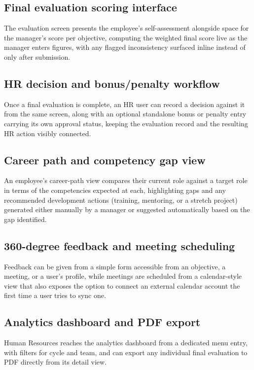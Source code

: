 \documentclass[12pt,a4paper]{report}
\begin{document}
\subsection{Final evaluation scoring interface}

The evaluation screen presents the employee's self-assessment alongside space for the manager's score per objective, computing the weighted final score live as the manager enters figures, with any flagged inconsistency surfaced inline instead of only after submission.

\subsection{HR decision and bonus/penalty workflow}

Once a final evaluation is complete, an HR user can record a decision against it from the same screen, along with an optional standalone bonus or penalty entry carrying its own approval status, keeping the evaluation record and the resulting HR action visibly connected.

\subsection{Career path and competency gap view}

An employee's career-path view compares their current role against a target role in terms of the competencies expected at each, highlighting gaps and any recommended development actions (training, mentoring, or a stretch project) generated either manually by a manager or suggested automatically based on the gap identified.

\subsection{360-degree feedback and meeting scheduling}

Feedback can be given from a simple form accessible from an objective, a meeting, or a user's profile, while meetings are scheduled from a calendar-style view that also exposes the option to connect an external calendar account the first time a user tries to sync one.

\subsection{Analytics dashboard and PDF export}

Human Resources reaches the analytics dashboard from a dedicated menu entry, with filters for cycle and team, and can export any individual final evaluation to PDF directly from its detail view.
\end{document}
